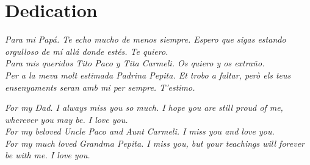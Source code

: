 \chapter*{Dedication} %

\textit{Para mi Papá. Te echo mucho de menos siempre. Espero que sigas estando orgulloso de mí allá donde estés. Te quiero.}\\[0.25cm]

\noindent\textit{Para mis queridos Tito Paco y Tita Carmeli. Os quiero y os extraño.}\\[0.25cm]

\noindent\textit{Per a la meva molt estimada Padrina Pepita. Et trobo a faltar, però els teus ensenyaments seran amb mi per sempre. T'estimo.}\\[0.25cm]

\vspace{+60pt}

\noindent\textit{For my Dad. I always miss you so much. I hope you are still proud of me, wherever you may be. I love you.}\\[0.25cm]

\noindent\textit{For my beloved Uncle Paco and Aunt Carmeli. I miss you and love you.}\\[0.25cm]

\noindent\textit{For my much loved Grandma Pepita. I miss you, but your teachings will forever be with me. I love you.}\\[0.25cm]
